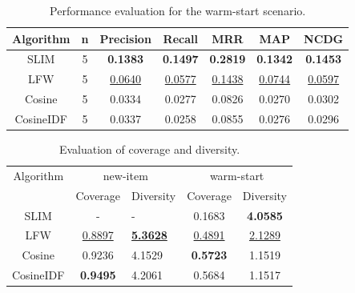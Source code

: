 \documentclass{sig-alternate}
\begin{document}
\begin{table}[ht]
    \centering
    \caption{Performance evaluation for the warm-start scenario.}
    \label{tab2}
    \setlength{\tabcolsep}{2pt}
    \begin{tabular}{ccccccc}
\hline
Algorithm & n & Precision       & Recall          & MRR             & MAP             & NCDG            \\ \hline
SLIM      & 5 & \textbf{0.1383} & \textbf{0.1497} & \textbf{0.2819} & \textbf{0.1342} & \textbf{0.1453} \\
LFW       & 5 & \underline{ 0.0640}    & \underline{0.0577}    & \underline{0.1438}    & \underline{0.0744}          & \underline{0.0597}          \\ 
Cosine    & 5 & 0.0334          & 0.0277          & 0.0826          & 0.0270          & 0.0302          \\
CosineIDF & 5 & 0.0337          & 0.0258          & 0.0855          & 0.0276          & 0.0296          \\ \hline
\end{tabular}
\end{table}

\begin{table}[ht]
    \centering
    \caption{Evaluation of coverage and diversity.}
    \label{tab3}
    \setlength{\tabcolsep}{3pt}
    \begin{tabular}{ccccc}
        \hline
        Algorithm &                 \multicolumn{2}{c}{new-item}                 &                 \multicolumn{2}{c}{warm-start}\\
          & Coverage        & \multicolumn{1}{l|}{Diversity}             & Coverage        & Diversity       \\ \hline
        SLIM      & -               & \multicolumn{1}{l|}{-}                     & 0.1683          & \textbf{4.0585} \\
        LFW       & \underline{0.8897}    & \multicolumn{1}{l|}{\underline{\textbf{5.3628}}} & \underline{0.4891}    & \underline{2.1289}    \\
        Cosine    & 0.9236          & \multicolumn{1}{l|}{4.1529}                & \textbf{0.5723} & 1.1519          \\
        CosineIDF & \textbf{0.9495} & \multicolumn{1}{l|}{4.2061}                & 0.5684          & 1.1517          \\ \hline
\end{tabular}
\end{table}
\end{document}
